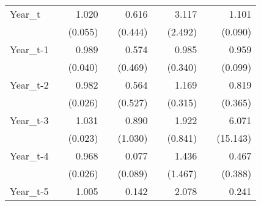 \begin{table}[htbp]
\begin{tabular}{l*{8}{D{.}{.}{-1}}}
Year\_t              &                     &       1.020         &                     &       0.616         &                     &       3.117         &                     &       1.101         \\
                    &                     &     (0.055)         &                     &     (0.444)         &                     &     (2.492)         &                     &     (0.090)         \\
Year\_t-1            &                     &       0.989         &                     &       0.574         &                     &       0.985         &                     &       0.959         \\
                    &                     &     (0.040)         &                     &     (0.469)         &                     &     (0.340)         &                     &     (0.099)         \\
Year\_t-2            &                     &       0.982         &                     &       0.564         &                     &       1.169         &                     &       0.819         \\
                    &                     &     (0.026)         &                     &     (0.527)         &                     &     (0.315)         &                     &     (0.365)         \\
Year\_t-3            &                     &       1.031         &                     &       0.890         &                     &       1.922         &                     &       6.071         \\
                    &                     &     (0.023)         &                     &     (1.030)         &                     &     (0.841)         &                     &    (15.143)         \\
Year\_t-4            &                     &       0.968         &                     &       0.077\sym{**} &                     &       1.436         &                     &       0.467         \\
                    &                     &     (0.026)         &                     &     (0.089)         &                     &     (1.467)         &                     &     (0.388)         \\
Year\_t-5            &                     &       1.005         &                     &       0.142\sym{*}  &                     &       2.078\sym{*}  &                     &       0.241         \\

\end{tabular}
\end{table}
